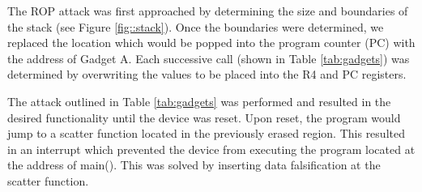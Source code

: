 The ROP attack was first approached by determining the size and boundaries of the stack (see Figure \ref{fig::stack}). Once the boundaries were determined, we replaced the location which would be popped into the program counter (PC) with the address of Gadget A. Each successive call (shown in Table \ref{tab:gadgets}) was determined by overwriting the values to be placed into the R4 and PC registers.

The attack outlined in Table \ref{tab:gadgets} was performed and resulted in the desired functionality until the device was reset. Upon reset, the program would jump to a scatter function located in the previously erased region. This resulted in an interrupt which prevented the device from executing the program located at the address of main(). This was solved by inserting data falsification at the scatter function. 